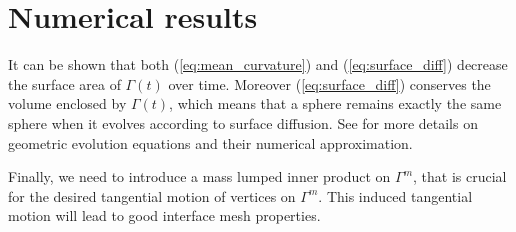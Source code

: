 \section[Numerical results]{Numerical results}

It can be shown that both (\ref{eq:mean_curvature}) and
(\ref{eq:surface_diff}) decrease the surface area of $\Gamma(t)$ over time.
Moreover (\ref{eq:surface_diff}) conserves the volume enclosed by $\Gamma(t)$,
which means that a sphere remains exactly the same sphere when it evolves
according to surface diffusion. See \cite{DeckelnickDE05} for more details on
geometric evolution equations and their numerical approximation.

Finally, we need to introduce a mass lumped inner product on $\Gamma^m$, that
is crucial for the desired tangential motion of vertices on $\Gamma^m$. This
induced tangential motion will lead to good interface mesh properties.
